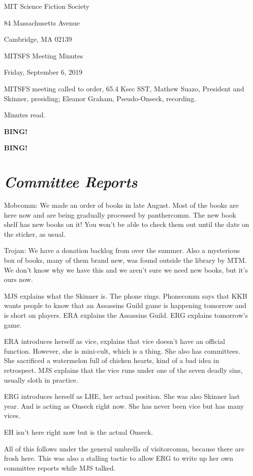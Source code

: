 \documentclass[10pt]{article}
\newcommand{\bing}{{\bf BING!} }
\newcommand{\goto}[1]{\bing \vskip 12pt \section*{{\em{#1}}}}
\newcommand{\skinner}{Mathew Suazo, President and Skinner}
\newcommand{\onseck}{Eleanor Graham, Pseudo-Onseck}
\newcommand{\meetingdate}{Friday, September 6, 2019 }
\begin{document}
\begin{center}

MIT Science Fiction Society

84 Massachusetts Avenue

Cambridge, MA 02139

\vspace{12pt}

MITSFS Meeting Minutes

\meetingdate

\end{center}

\vspace{18pt}

\setlength{\parskip}{6pt}

\noindent
MITSFS meeting called to order, 65.4 Ksec SST,
\skinner, presiding; \onseck, recording.

Minutes read.

\bing

\goto{Committee Reports}

Mobcomm: We made an order of books in late August. Most of the books are here now and are being gradually processed by panthercomm. The new book shelf has new books on it! You won't be able to check them out until the date on the sticker, as usual.

Trojan: We have a donation backlog from over the summer. Also a mysterious box of books, many of them brand new, was found outside the library by MTM. We don't know why we have this and we aren't sure we need new books, but it's ours now.

MJS explains what the Skinner is. The phone rings. Phonecomm says that KKB wants people to know that an Assassins Guild game is happening tomorrow and is short on players. ERA explains the Assassins Guild. ERG explains tomorrow's game. 

ERA introduces herself as vice, explains that vice doesn't have an official function. However, she is mini-cult, which is a thing. She also has committees. She sacrificed a watermelon full of chicken hearts, kind of a bad idea in retrospect. MJS explains that the vice runs under one of the seven deadly sins, usually sloth in practice.

ERG introduces herself as LHE, her actual position. She was also Skinner last year. And is acting as Onseck right now. She has never been vice but has many vices. 

EH isn't here right now but is the actual Onseck.

All of this follows under the general umbrella of visitorcomm, because there are frosh here. This was also a stalling tactic to allow ERG to write up her own committee reports while MJS talked. 
\end{document}
